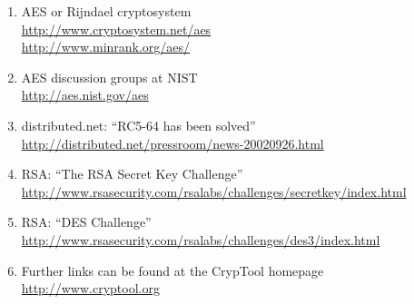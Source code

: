 \begin{enumerate}

\item AES or Rijndael cryptosystem \\
        \url{http://www.cryptosystem.net/aes} \\
	\url{http://www.minrank.org/aes/}

  \item AES discussion groups at NIST \\
	\url{http://aes.nist.gov/aes}

  \item distributed.net: ``RC5-64 has been solved'' \\
        \url{http://distributed.net/pressroom/news-20020926.html}

  \item RSA: ``The RSA Secret Key Challenge'' \\
      \url{http://www.rsasecurity.com/rsalabs/challenges/secretkey/index.html}

  \item RSA: ``DES Challenge'' \\
        \url{http://www.rsasecurity.com/rsalabs/challenges/des3/index.html}

  \item Further links can be found at the CrypTool homepage \\
        \url{http://www.cryptool.org}
	       
\end{enumerate}



